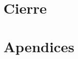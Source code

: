 \documentclass[titlepage,openright,twoside,a4paper,draft,12pt,spanish]{book}
\begin{document}
\part{Cierre}
%


\part{Apendices}
\appendix





\lineNumbersOff


\renewcommand{\bibname}{Referencias bibliográficas}

\end{document}
